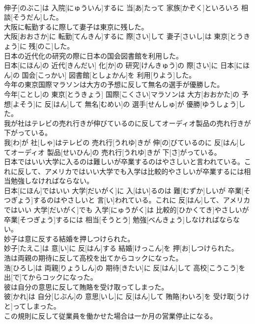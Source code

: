\documentclass[8pt]{extreport}
\begin{document}
\begin{CJK}{UTF8}{min}
\\	伸子[のぶこ]は 入院[にゅういん]するに 当[あ]たって 家族[かぞく]といろいろ 相談[そうだん]した。
\\	大阪に転勤するに際して妻子は東京に残した。	
\\	大阪[おおさか]に 転勤[てんきん]するに 際[さい]して 妻子[さいし]は 東京[とうきょう]に 残[のこ]した。
\\	日本の近代化の研究の際に日本の国会図書館を利用した。	
\\	日本[にほん]の 近代[きんだい] 化[か]の 研究[けんきゅう]の 際[さい]に 日本[にほん]の 国会[こっかい] 図書館[としょかん]を 利用[りよう]した。
\\	今年の東京国際マラソンは大方の予想に反して無名の選手が優勝した。	
\\	今年[ことし]の 東京[とうきょう] 国際[こくさい]マラソンは 大方[おおかた]の 予想[よそう]に 反[はん]して 無名[むめい]の 選手[せんしゅ]が 優勝[ゆうしょう]した。
\\	我が社はテレビの売れ行きが伸びているのに反してオーディオ製品の売れ行きが下がっている。	
\\	我[わ]が 社[しゃ]はテレビの 売れ行[うれゆ]きが 伸[の]びているのに 反[はん]してオーディオ 製品[せいひん]の 売れ行[うれゆ]きが 下[さ]がっている。
\\	日本ではいい大学に入るのは難しいが卒業するのはやさしいと言われている。これに反して、アメリカではいい大学でも入学は比較的やさしいが卒業するには相当勉強しなければならない。	
\\	日本[にほん]ではいい 大学[だいがく]に 入[はい]るのは 難[むずか]しいが 卒業[そつぎょう]するのはやさしいと 言[い]われている。これに 反[はん]して、アメリカではいい 大学[だいがく]でも 入学[にゅうがく]は 比較的[ひかくてき]やさしいが 卒業[そつぎょう]するには 相当[そうとう] 勉強[べんきょう]しなければならない。
\\	妙子は意に反する結婚を押しつけられた。	
\\	妙子[たえこ]は 意[い]に 反[はん]する 結婚[けっこん]を 押[お]しつけられた。
\\	浩は両親の期待に反して高校を出てからコックになった。	
\\	浩[ひろし]は 両親[りょうしん]の 期待[きたい]に 反[はん]して 高校[こうこう]を 出[で]てからコックになった。
\\	彼は自分の意思に反して賄賂を受け取ってしまった。	
\\	彼[かれ]は 自分[じぶん]の 意思[いし]に 反[はん]して 賄賂[わいろ]を 受け取[うけと]ってしまった。
\\	この規則に反して従業員を働かせた場合は一か月の営業停止になる。	

\end{CJK}
\end{document}
